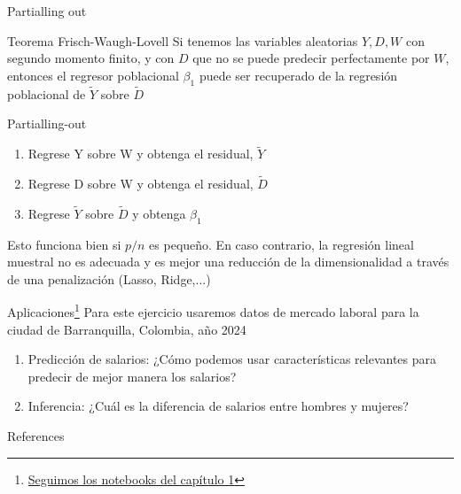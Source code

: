 \documentclass[aspectratio=169,xcolor=dvipsnames]{beamer}
\begin{document}
\begin{frame}{Partialling out}
\begin{block}{Teorema Frisch-Waugh-Lovell}
    Si tenemos las variables aleatorias $Y,D,W$ con segundo momento finito, y con $D$ que no se puede predecir perfectamente por $W$, entonces el regresor poblacional $\beta_1$ puede ser recuperado de la regresión poblacional de $\tilde{Y}$ sobre $\tilde{D}$
\end{block}
    
\end{frame}

\begin{frame}{Partialling-out}

\begin{enumerate}
    \item Regrese Y sobre W y obtenga el residual, $\tilde{Y}$
    \item Regrese D sobre W y obtenga el residual, $\tilde{D}$
    \item Regrese $\tilde{Y}$ sobre $\tilde{D}$ y obtenga $\beta_1$
\end{enumerate}

Esto funciona bien si $p/n$ es pequeño. En caso contrario, la regresión lineal muestral no es adecuada y es mejor una reducción de la dimensionalidad a través de una penalización (Lasso, Ridge,...)
    
\end{frame}

\begin{frame}{Aplicaciones\footnote{\href{https://causalml-book.org/}{Seguimos los notebooks del capítulo 1}}}
Para este ejercicio usaremos datos de mercado laboral para la ciudad de Barranquilla, Colombia, año 2024

\vspace{2mm}

\begin{enumerate}
    \item Predicción de salarios: ¿Cómo podemos usar características relevantes para predecir de mejor manera los salarios?
    \item Inferencia: ¿Cuál es la diferencia de salarios entre hombres y mujeres?
\end{enumerate}
    
\end{frame}



\begin{frame}{References}


\end{frame}
\end{document}
